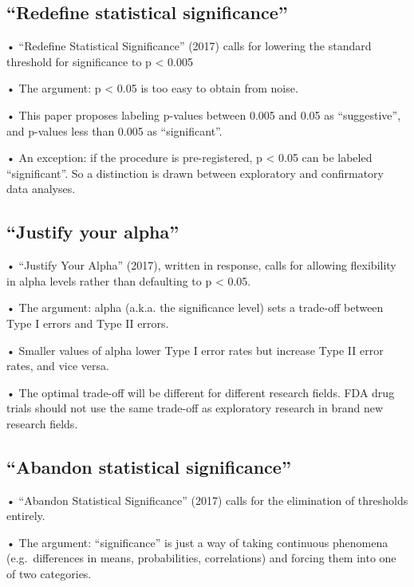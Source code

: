 \documentclass[
  letterpaper,
  DIV=11,
  numbers=noendperiod]{scrreprt}
\begin{document}
\hypertarget{redefine-statistical-significance}{%
\subsection{``Redefine statistical
significance''}\label{redefine-statistical-significance}}

• ``Redefine Statistical Significance'' (2017) calls for lowering the
standard threshold for significance to p \textless{} 0.005

• The argument: p \textless{} 0.05 is too easy to obtain from noise.

• This paper proposes labeling p-values between 0.005 and 0.05 as
``suggestive'', and p-values less than 0.005 as ``significant''.

• An exception: if the procedure is pre-registered, p \textless{} 0.05
can be labeled ``significant''. So a distinction is drawn between
exploratory and confirmatory data analyses.

\hypertarget{justify-your-alpha}{%
\subsection{``Justify your alpha''}\label{justify-your-alpha}}

• ``Justify Your Alpha'' (2017), written in response, calls for allowing
flexibility in alpha levels rather than defaulting to p \textless{}
0.05.

• The argument: alpha (a.k.a. the significance level) sets a trade-off
between Type I errors and Type II errors.

• Smaller values of alpha lower Type I error rates but increase Type II
error rates, and vice versa.

• The optimal trade-off will be different for different research fields.
FDA drug trials should not use the same trade-off as exploratory
research in brand new research fields.

\hypertarget{abandon-statistical-significance}{%
\subsection{``Abandon statistical
significance''}\label{abandon-statistical-significance}}

• ``Abandon Statistical Significance'' (2017) calls for the elimination
of thresholds entirely.

• The argument: ``significance'' is just a way of taking continuous
phenomena (e.g.~differences in means, probabilities, correlations) and
forcing them into one of two categories.
\end{document}
